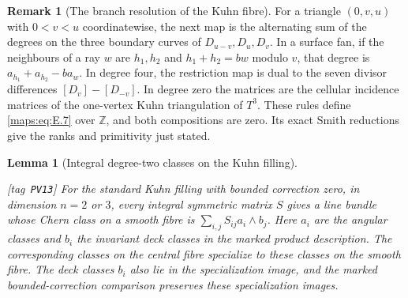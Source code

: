 \documentclass[11pt,a4paper]{article}
\numberwithin{equation}{section}
\newtheorem{lemma}[lemma]{Lemma}
\theoremstyle{definition}
\newtheorem{remark}[remark]{Remark}
\newcommand{\StatementRecord}[4]{{\upshape\footnotesize[tag~\texttt{#3}]}\enspace\ignorespaces}
\begin{document}
\begin{remark}[The branch resolution of the Kuhn fibre]
For a triangle $(0,v,u)$ with $0<v<u$ coordinatewise, the next map
is the alternating sum of the degrees on the three boundary curves
of $D_{u-v},D_u,D_v$.  In a surface fan, if the neighbours of a ray
$w$ are $h_1,h_2$ and $h_1+h_2=bw$ modulo $v$, that degree is
$a_{h_1}+a_{h_2}-ba_w$.  In degree four, the restriction map is dual
to the seven divisor differences $[D_v]-[D_{-v}]$.  In degree zero
the matrices are the cellular incidence matrices of the one-vertex
Kuhn triangulation of $T^3$.  These rules define \eqref{maps:eq:E.7} over
$\mathbb Z$, and both compositions are zero.
Its exact Smith reductions give the ranks and primitivity just stated.


\end{remark}

\begin{lemma}[Integral degree-two classes on the Kuhn filling]
\hypertarget{tag-PV13}{}\label{pub:V:cusp-chern-generators}
\StatementRecord{pub:V:cusp-chern-generators}{proved}{PV13}{\cref{pub:V:cusp-smooth-dependence}}
For the standard Kuhn filling with bounded correction zero, in dimension
$n=2$ or $3$, every integral symmetric matrix $S$ gives a line bundle
whose Chern class on a smooth fibre is
$\sum_{i,j}S_{ij}a_i\wedge b_j$.
Here $a_i$ are the angular classes and $b_i$ the invariant deck
classes in the marked product description. The corresponding classes
on the central fibre specialize to these classes on the smooth fibre.
The deck classes $b_i$ also lie in the specialization image, and
the marked bounded-correction comparison preserves these specialization images.
\end{lemma}
\end{document}
